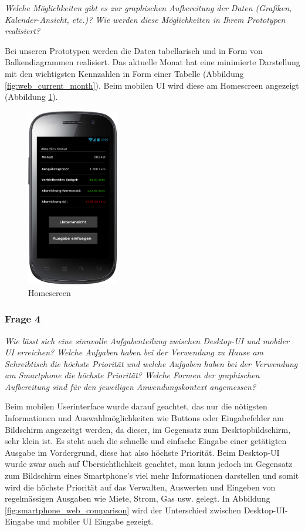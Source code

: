 \emph{Welche Möglichkeiten gibt es zur graphischen Aufbereitung der Daten 
(Grafiken, Kalender-Ansicht, etc.)? Wie werden diese Möglichkeiten in Ihrem Prototypen realisiert?}

\vspace{2mm}
Bei unseren Prototypen werden die Daten tabellarisch und in Form von Balkendiagrammen realisiert.
Das aktuelle Monat hat eine minimierte Darstellung mit den wichtigsten Kennzahlen in Form einer 
Tabelle (Abbildung \ref{fig:web_current_month}). Beim mobilen UI wird diese am Homescreen angezeigt
(Abbildung \ref{fig:smartphone_homescreen}).

\begin{figure}[htl]
\centering
\includegraphics[width=4cm]{img/smartphone_homescreen}
\caption{Homescreen}
\label{fig:smartphone_homescreen}
\end{figure}

\newpage
\subsubsection{Frage 4}

\emph{Wie lässt sich eine sinnvolle Aufgabenteilung zwischen Desktop-UI und mobiler UI erreichen?
Welche Aufgaben haben bei der Verwendung zu Hause am Schreibtisch die höchste Priorität und welche
Aufgaben haben bei der Verwendung am Smartphone die höchste Priorität? Welche Formen der graphischen
Aufbereitung sind für den jeweiligen Anwendungskontext angemessen?}

\vspace{2mm}

Beim mobilen Userinterface wurde darauf geachtet, das nur die n\"otigsten Informationen und
Auswahlm\"oglichkeiten wie Buttons oder Eingabefelder am Bildschirm angezeitgt werden, da dieser,
im Gegensatz zum Desktopbildschirm, sehr klein ist. Es steht auch die schnelle und einfache
Eingabe einer get\"atigten Ausgabe im Vordergrund, diese hat also h\"ochste Priorit\"at.
Beim Desktop-UI wurde zwar auch auf \"Ubersichtlichkeit geachtet, man kann jedoch im Gegensatz
zum Bildschirm eines Smartphone's viel mehr Informationen darstellen und somit wird die h\"ochste
Priorit\"at auf das Verwalten, Auswerten und Eingeben von regelm\"assigen Ausgaben wie Miete, Strom,
Gas usw. gelegt. In Abbildung \ref{fig:smartphone_web_comparison} wird der Unterschied zwischen Desktop-UI-Eingabe und mobiler UI Eingabe gezeigt.

